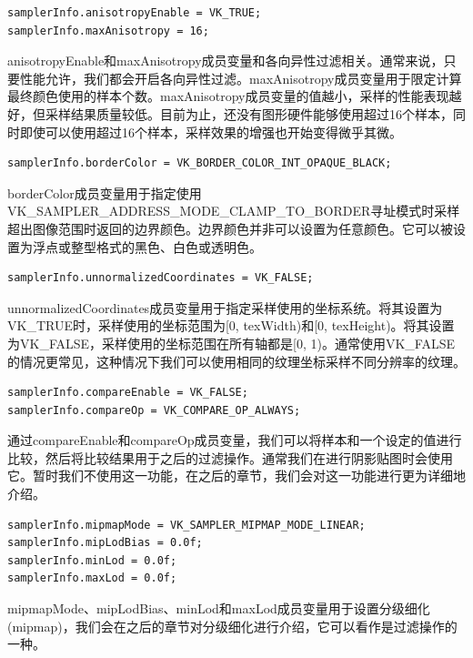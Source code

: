 \documentclass{ctexart}
\begin{document}
\begin{lstlisting}[language={[ANSI]C}]
samplerInfo.anisotropyEnable = VK_TRUE;
samplerInfo.maxAnisotropy = 16;
\end{lstlisting}

anisotropyEnable和maxAnisotropy成员变量和各向异性过滤相关。通常来说，只要性能允许，我们都会开启各向异性过滤。maxAnisotropy成员变量用于限定计算最终颜色使用的样本个数。maxAnisotropy成员变量的值越小，采样的性能表现越好，但采样结果质量较低。目前为止，还没有图形硬件能够使用超过16个样本，同时即使可以使用超过16个样本，采样效果的增强也开始变得微乎其微。

\begin{lstlisting}[language={[ANSI]C}]
samplerInfo.borderColor = VK_BORDER_COLOR_INT_OPAQUE_BLACK;
\end{lstlisting}

borderColor成员变量用于指定使用VK\_SAMPLER\_ADDRESS\_MODE\_CLAMP\_TO\_BORDER寻址模式时采样超出图像范围时返回的边界颜色。边界颜色并非可以设置为任意颜色。它可以被设置为浮点或整型格式的黑色、白色或透明色。

\begin{lstlisting}[language={[ANSI]C}]
samplerInfo.unnormalizedCoordinates = VK_FALSE;
\end{lstlisting}

unnormalizedCoordinates成员变量用于指定采样使用的坐标系统。将其设置为VK\_TRUE时，采样使用的坐标范围为[0, texWidth)和[0, texHeight)。将其设置为VK\_FALSE，采样使用的坐标范围在所有轴都是[0, 1)。通常使用VK\_FALSE的情况更常见，这种情况下我们可以使用相同的纹理坐标采样不同分辨率的纹理。

\begin{lstlisting}[language={[ANSI]C}]
samplerInfo.compareEnable = VK_FALSE;
samplerInfo.compareOp = VK_COMPARE_OP_ALWAYS;
\end{lstlisting}

通过compareEnable和compareOp成员变量，我们可以将样本和一个设定的值进行比较，然后将比较结果用于之后的过滤操作。通常我们在进行阴影贴图时会使用它。暂时我们不使用这一功能，在之后的章节，我们会对这一功能进行更为详细地介绍。

\begin{lstlisting}[language={[ANSI]C}]
samplerInfo.mipmapMode = VK_SAMPLER_MIPMAP_MODE_LINEAR;
samplerInfo.mipLodBias = 0.0f;
samplerInfo.minLod = 0.0f;
samplerInfo.maxLod = 0.0f;
\end{lstlisting}

mipmapMode、mipLodBias、minLod和maxLod成员变量用于设置分级细化(mipmap)，我们会在之后的章节对分级细化进行介绍，它可以看作是过滤操作的一种。
\end{document}

